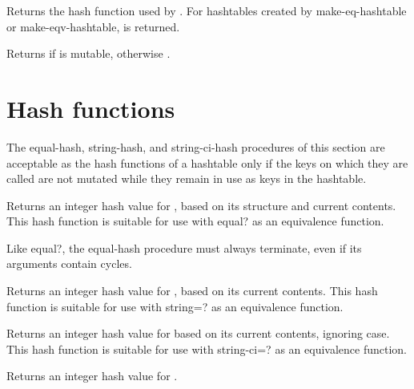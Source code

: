 \begin{entry}{}

Returns the hash function used by .
For hashtables created by {\cf make-eq-hashtable} 
or {\cf make-eqv-hashtable}, \schfalse{} is returned.
\end{entry}

\begin{entry}{}

Returns \schtrue{} if  is mutable, otherwise \schfalse{}.
\end{entry}

\section{Hash functions}

The {\cf equal-hash}, {\cf string-hash}, and {\cf string-ci-hash}
procedures of this section are acceptable as the hash functions of
a hashtable only if the keys on which they are called are not mutated
while they remain in use as keys in the hashtable.

\begin{entry}{}

Returns an integer hash value for , based on
its structure and current contents.  This hash function is suitable
for use with {\cf equal?} as an equivalence function.

\begin{note}
  Like {\cf equal?}, the {\cf equal-hash} procedure must always
  terminate, even if its arguments contain cycles.
\end{note}
\end{entry}

\begin{entry}{}

Returns an integer hash value for , based on
its current contents.
This hash function is suitable
for use with {\cf string=?} as an equivalence function.
\end{entry}

\begin{entry}{}

Returns an integer hash value for  based on
its current contents, ignoring case.
This hash function is suitable
for use with {\cf string-ci=?} as an equivalence function.
\end{entry}

\begin{entry}{}

Returns an integer hash value for .
\end{entry}

